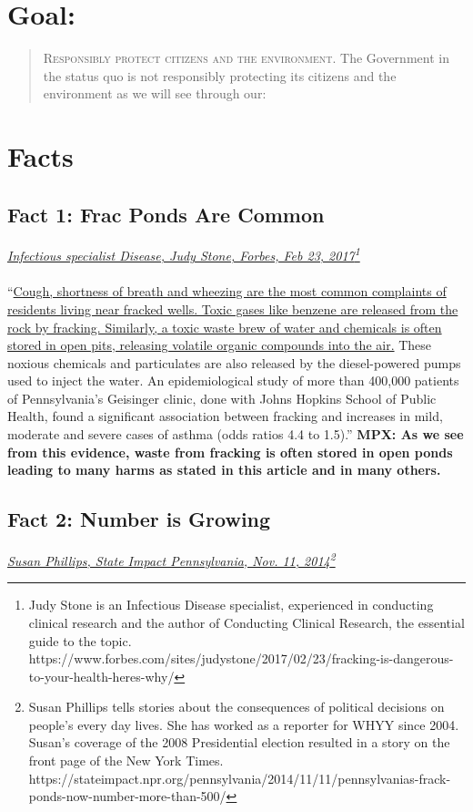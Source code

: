\documentclass[11pt]{article}
\begin{document}
	\section{Goal:}
	\begin{quotation}
		\lettrine{R}{esponsibly protect citizens and the environment.}
		The Government in the status quo is not responsibly protecting its citizens and the environment as we will see through our:
	\end{quotation}
	
	\normalsize
	
	\section{Facts}
	
	\subsection{Fact 1: Frac Ponds Are Common}
	\textit{\ul{Infectious specialist Disease, Judy Stone, Forbes, Feb 23, 2017}\footnote{Judy Stone is an Infectious Disease specialist, experienced in conducting clinical research and the author of Conducting Clinical Research, the essential guide to the topic. https://www.forbes.com/sites/judystone/2017/02/23/fracking-is-dangerous-to-your-health-heres-why/}}
	\paragraph{}
	``\ul{Cough, shortness of breath and wheezing are the most common complaints of residents living near fracked wells. Toxic gases like benzene are released from the rock by fracking. Similarly, a toxic waste brew of water and chemicals is often stored in open pits, releasing volatile organic compounds into the air.} These noxious chemicals and particulates are also released by the diesel-powered pumps used to inject the water. An epidemiological study of more than 400,000 patients of Pennsylvania’s Geisinger clinic, done with Johns Hopkins School of Public Health, found a significant association between fracking and increases in mild, moderate and severe cases of asthma (odds ratios 4.4 to 1.5).''\newline
	\textbf{MPX: As we see from this evidence, waste from fracking is often stored in open ponds leading to many harms as stated in this article and in many others.}
	
	\subsection{Fact 2: Number is Growing}
	\textit{\ul{Susan Phillips, State Impact Pennsylvania, Nov. 11, 2014}\footnote{Susan Phillips tells stories about the consequences of political decisions on people's every day lives. She has worked as a reporter for WHYY since 2004. Susan's coverage of the 2008 Presidential election resulted in a story on the front page of the New York Times. https://stateimpact.npr.org/pennsylvania/2014/11/11/pennsylvanias-frack-ponds-now-number-more-than-500/}}
\end{document}
